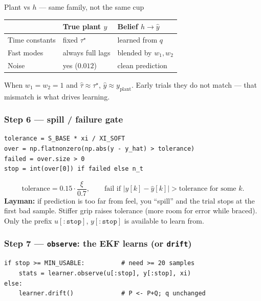 \documentclass[11pt,a4paper]{article}
\begin{document}
\begin{examplebox}{Plant vs $h$ --- same family, not the same cup}
\begin{center}
\small
\begin{tabular}{@{}lll@{}}
\toprule
 & True plant $y$ & Belief $h\to\hat y$ \\
\midrule
Time constants & fixed $\tau^\star$ & learned from $q$ \\
Fast modes & always full lags & blended by $w_1,w_2$ \\
Noise & yes ($0.012$) & clean prediction \\
\bottomrule
\end{tabular}
\end{center}
When $w_1=w_2=1$ and $\hat\tau\approx\tau^\star$, $\hat y\approx y_{\mathrm{plant}}$.
Early trials they do not match --- that mismatch is what drives learning.
\end{examplebox}

\subsubsection{Step 6 --- spill / failure gate}

\begin{verbatim}
tolerance = S_BASE * xi / XI_SOFT
over = np.flatnonzero(np.abs(y - y_hat) > tolerance)
failed = over.size > 0
stop = int(over[0]) if failed else n_t
\end{verbatim}

\begin{equation}
\text{tolerance} = 0.15\cdot\frac{\xi}{0.7},
\qquad
\text{fail if } |y[k]-\hat y[k]| > \text{tolerance for some }k.
\label{eq:l4fail}
\end{equation}
\textbf{Layman:} if prediction is too far from feel, you ``spill'' and the
trial stops at the first bad sample.  Stiffer grip raises tolerance
(more room for error while braced).  Only the prefix $u[:\texttt{stop}]$,
$y[:\texttt{stop}]$ is available to learn from.

\subsubsection{Step 7 --- \texttt{observe}: the EKF learns (or \texttt{drift})}

\begin{verbatim}
if stop >= MIN_USABLE:          # need >= 20 samples
    stats = learner.observe(u[:stop], y[:stop], xi)
else:
    learner.drift()             # P <- P+Q; q unchanged
\end{verbatim}
\end{document}
